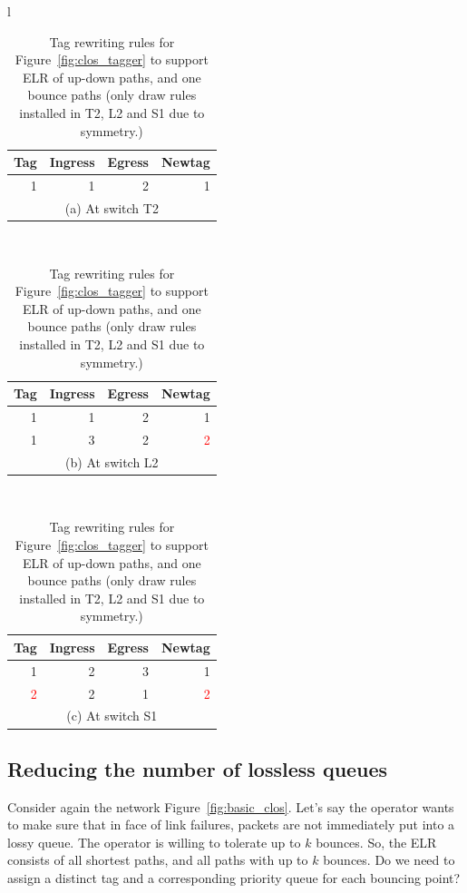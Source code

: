\begin{table}[t]
		\centering
		\footnotesize
		\begin{tabular}{l}
		\begin{tabular}{|r|r|r|r|}
			\hline
			Tag&  Ingress& Egress & Newtag \\
			\hline
			\hline
			1 & 1 & 2 & 1 \\
			\hline
			\multicolumn{4}{c}{(a) At switch T2} \\
		\end{tabular}
		\\
		\begin{tabular}{|r|r|r|r|}
			\hline
			Tag&  Ingress& Egress & Newtag \\
			\hline
			\hline
			1 & 1 & 2 & 1 \\
			\hline
			1 & 3 & 2 & \textcolor{red}{2} \\
			\hline
			\multicolumn{4}{c}{(b) At switch L2} \\
		\end{tabular}
		\\
		
		\begin{tabular}{|r|r|r|r|}
			\hline
			Tag&  Ingress& Egress & Newtag \\
			\hline
			\hline
			1 & 2 & 3 & 1 \\
				\hline
			\textcolor{red}{2} & 2 & 1 & \textcolor{red}{2} \\
			\hline
			\multicolumn{4}{c}{(c) At switch S1} \\
		\end{tabular}
		
	\end{tabular}
		\caption{Tag rewriting rules for Figure~\ref{fig:clos_tagger} to support
		ELR of up-down paths, and one bounce paths (only draw rules installed in T2, L2 and S1 due to symmetry.)}
		\label{tab:clos_tag_rules}
		\vspace{-1em}
\end{table}

\subsection{Reducing the number of lossless queues}
\label{subsec:combine}

Consider again the network Figure~\ref{fig:basic_clos}.  Let's say the operator
wants to make sure that in face of link failures, packets are not immediately
put into a lossy queue. The operator is willing to tolerate up to $k$ bounces.
So, the ELR consists of all shortest paths, and all paths with up to $k$ bounces.
Do we need to assign a distinct tag and a corresponding priority queue for each
bouncing point?

